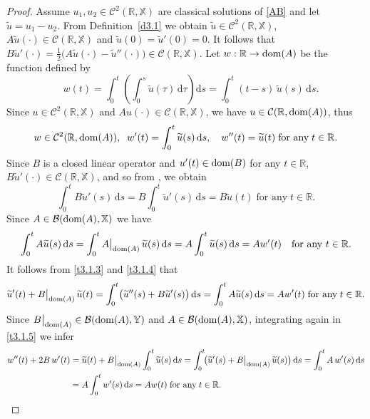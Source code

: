 \documentclass[11pt]{amsart}
\numberwithin{equation}{section}
\newcommand\R{\mathbb R}
\newcommand{\RR}{{\mathbb R}}
\newcommand{\tu}{{\widetilde{u}}}
\newcommand{\rmd}{{\mathrm{d}}}
\theoremstyle{remark}
\theoremstyle{definition}
\newcommand\bX{{\mathbb X}}
\newcommand\bY{{\mathbb Y}}
\newcommand{\dom}{\text{\rm{dom}}}
\begin{document}
\begin{proof}
Assume $u_1, u_2 \in \mathcal{C}^2(\R, \bX)$ are classical solutions of \eqref{AB} and let $\tu=u_1-u_2$. From Definition~\ref{d3.1} we obtain  $\tu\in\mathcal{C}^2(\RR,\bX)$, $A\tu(\cdot)\in\mathcal{C}(\RR,\bX)$ and $\tu(0)=\tu'(0)=0$. It follows that $B\tu'(\cdot) = \tfrac{1}{2}\bigl(A\tu(\cdot) - \tu''(\cdot)\bigr) \in \mathcal{C}(\RR, \bX)$. Let $w : \R \to \dom(A)$ be the function defined by
	\begin{equation}\label{t3.1.1}
		\quad w(t) = \int_0^t\!\!\left(\int_0^s \tu(\tau)\,\rmd\tau\right)\rmd s
		= \int_0^t (t-s)\,\tu(s)\,\rmd s.
	\end{equation}
	Since $u \in \mathcal{C}^2(\RR, \bX)$ and $Au(\cdot) \in \mathcal{C}(\RR, \bX)$, we have
	$u \in \mathcal{C}(\RR, \dom(A))$, thus
	\begin{equation}\label{t3.1.2}
		w \in \mathcal{C}^2(\RR, \dom(A)),\;\;
		w'(t) = \int_0^t \tu(s)\,\rmd s,\quad w''(t) = \tu(t)\;\mbox{for any}\; t\in\RR.
	\end{equation}
	Since $B$ is a closed linear operator and $u'(t) \in \dom(B)$ for any
	$t \in \RR$, $B\tu'(\cdot) \in \mathcal{C}(\R, \bX)$,  and so from \cite[Proposition~1.1.7]{ABHN},  we obtain 
	\begin{equation}\label{t3.1.3}
		\int_0^t B\tu'(s)\,\rmd s = B\int_0^t \tu'(s)\,\rmd s = B\tu(t)\;\text{for any}\; t \in \R.
	\end{equation}
	Since $A \in \mathcal{B}(\dom(A), \bX)$ we have
	\begin{equation}\label{t3.1.4}
		\int_0^t A\tu(s)\,\rmd s
		= \int_0^t A\big|_{\dom(A)}\, \tu(s)\,\rmd s
		= A\int_0^t \tu(s)\,\rmd s
		= Aw'(t)\quad\text{for any }t \in \R.
	\end{equation}
It follows from \eqref{t3.1.3} and \eqref{t3.1.4} that
	\begin{equation}\label{t3.1.5}
		\tu'(t) + B\big|_{\dom(A)}\,\tu(t)= \int_0^t \bigl(\tu''(s) + B\tu'(s)\bigr)\,\rmd s
		= \int_0^t A\tu(s)\,\rmd s
		= Aw'(t)\;\text{for any}\; t \in \R.
	\end{equation}
	Since $B\big|_{\dom(A)} \in \mathcal{B}(\dom(A), \bY)$ and $A \in \mathcal{B}(\dom(A), \bX)$,
	integrating again in \eqref{t3.1.5} we infer
	\begin{align}\label{t3.1.6}
		w''(t) + 2B\,w'(t)
		&= \tu(t) + B\big|_{\dom(A)}\int_0^t \tu(s)\,\rmd s= \int_0^t\!\bigl(\tu'(s) + B\big|_{\dom(A)}\,\tu(s)\bigr)\,\rmd s
		= \int_0^t A\,w'(s)\,\rmd s\nonumber\\
		&= A\int_0^t w'(s)\,\rmd s= Aw(t)\;\text{for any}\;t \in \R.
	\end{align}

\end{proof}
\end{document}
